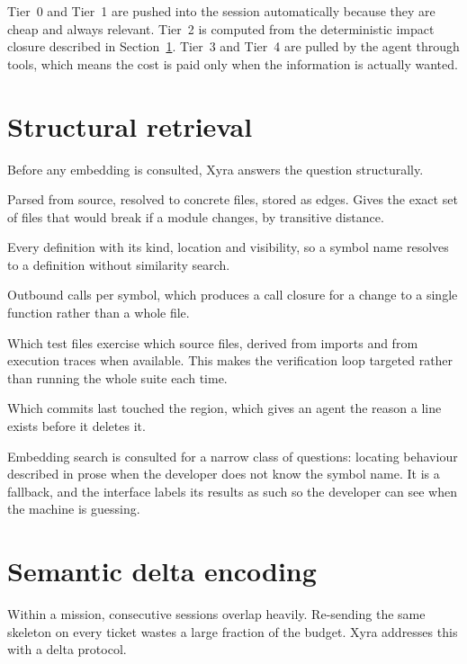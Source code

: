Tier~0 and Tier~1 are pushed into the session automatically because they are cheap and
always relevant. Tier~2 is computed from the deterministic impact closure described in
Section~\ref{sec:structural}. Tier~3 and Tier~4 are pulled by the agent through tools, which
means the cost is paid only when the information is actually wanted.

\section{Structural retrieval}
\label{sec:structural}

Before any embedding is consulted, Xyra answers the question structurally.

\begin{description}[style=nextline,leftmargin=0pt]
  \item[Import graph.] Parsed from source, resolved to concrete files, stored as edges. Gives
  the exact set of files that would break if a module changes, by transitive distance.
  \item[Symbol table.] Every definition with its kind, location and visibility, so a symbol
  name resolves to a definition without similarity search.
  \item[Call edges.] Outbound calls per symbol, which produces a call closure for a change to
  a single function rather than a whole file.
  \item[Test mapping.] Which test files exercise which source files, derived from imports and
  from execution traces when available. This makes the verification loop targeted rather than
  running the whole suite each time.
  \item[Blame and history.] Which commits last touched the region, which gives an agent the
  reason a line exists before it deletes it.
\end{description}

Embedding search is consulted for a narrow class of questions: locating behaviour described
in prose when the developer does not know the symbol name. It is a fallback, and the
interface labels its results as such so the developer can see when the machine is guessing.

\section{Semantic delta encoding}

Within a mission, consecutive sessions overlap heavily. Re-sending the same skeleton on every
ticket wastes a large fraction of the budget. Xyra addresses this with a delta protocol.


